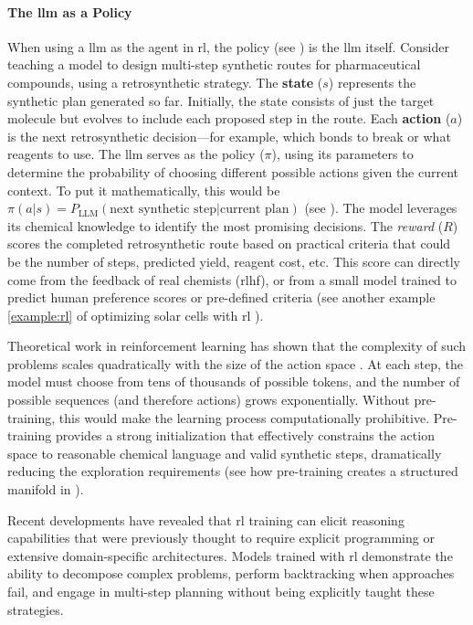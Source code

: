 \paragraph{The \gls{llm} as a Policy}
When using a \gls{llm} as the agent in \gls{rl}, the policy (see ) is the \gls{llm} itself. 
Consider teaching a model to design multi-step synthetic routes for pharmaceutical compounds, using a retrosynthetic strategy. 
The \textbf{state} ($s$) represents the synthetic plan generated so far. Initially, the state consists of just the target molecule but evolves to include each proposed step in the route. Each \textbf{action} ($a$) is the next retrosynthetic decision---for example, which bonds to break or what reagents to use. The \gls{llm} serves as the policy ($\pi$), using its parameters to determine the probability of choosing different possible actions given the current context. 
To put it mathematically, this would be $\pi(a|s) = P_{\text{LLM}}(\text{next synthetic step}|\text{current plan})$ (see ). 
The model leverages its chemical knowledge to identify the most promising decisions. 
The \emph{reward} ($R$) scores the completed retrosynthetic route based on practical criteria that could be the number of steps, predicted yield, reagent cost, etc. 
This score can directly come from the feedback of real chemists (\gls{rlhf}), or from a small model trained to predict human preference scores or pre-defined criteria (see another example \ref{example:rl} of optimizing solar cells with \gls{rl} ). 

Theoretical work in reinforcement learning has shown that the complexity of such problems scales quadratically with the size of the action space \autocite{dann2015sample}. 
At each step, the model must choose from tens of thousands of possible tokens, and the number of possible sequences (and therefore actions) grows exponentially. 
Without pre-training, this would make the learning process computationally prohibitive. 
Pre-training provides a strong initialization that effectively constrains the action space to reasonable chemical language and valid synthetic steps, dramatically reducing the exploration requirements (see how pre-training creates a structured manifold in ).

Recent developments have revealed that \gls{rl} training can elicit reasoning capabilities that were previously thought to require explicit programming or extensive domain-specific architectures. 
Models trained with \gls{rl} demonstrate the ability to decompose complex problems, perform backtracking when approaches fail, and engage in multi-step planning without being explicitly taught these strategies. \autocite{xu2025towards}


